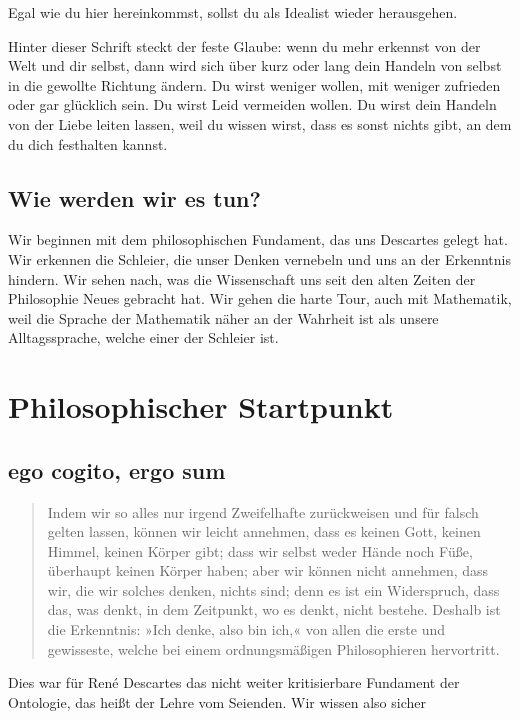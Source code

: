 \documentclass[12pt]{book}
\begin{document}
Egal wie du hier hereinkommst, sollst du als Idealist wieder herausgehen.

Hinter dieser Schrift steckt der feste Glaube: wenn du mehr erkennst von der Welt und dir selbst,
dann wird sich über kurz oder lang dein Handeln von selbst in die gewollte Richtung ändern. Du wirst weniger wollen, mit weniger zufrieden
oder gar glücklich sein. Du wirst Leid vermeiden wollen. Du wirst dein Handeln von der Liebe leiten lassen, weil du wissen wirst,
dass es sonst nichts gibt, an dem du dich festhalten kannst.

\section{Wie werden wir es tun?}

Wir beginnen mit dem philosophischen Fundament, das uns Descartes gelegt hat.
Wir erkennen die Schleier, die unser Denken vernebeln und uns an der Erkenntnis hindern.
Wir sehen nach, was die Wissenschaft uns seit den alten Zeiten der Philosophie Neues gebracht hat.
Wir gehen die harte Tour, auch mit Mathematik, weil die Sprache der Mathematik näher an der Wahrheit ist als unsere Alltagssprache, welche einer der Schleier ist.

\chapter{Philosophischer Startpunkt}

\section{ego cogito, ergo sum}

\begin{quote}\begin{tcolorbox}
Indem wir so alles nur irgend Zweifelhafte zurückweisen und für falsch gelten lassen, können wir leicht annehmen, dass es keinen Gott, keinen Himmel, keinen Körper gibt; dass wir selbst weder Hände noch Füße, überhaupt keinen Körper haben; aber wir können nicht annehmen, dass wir, die wir solches denken, nichts sind; denn es ist ein Widerspruch, dass das, was denkt, in dem Zeitpunkt, wo es denkt, nicht bestehe. Deshalb ist die Erkenntnis: »Ich denke, also bin ich,« von allen die erste und gewisseste, welche bei einem ordnungsmäßigen Philosophieren hervortritt.
\end{tcolorbox}\end{quote}

Dies war für René Descartes das nicht weiter kritisierbare Fundament der Ontologie, das heißt der Lehre vom Seienden. Wir wissen also sicher
\end{document}
